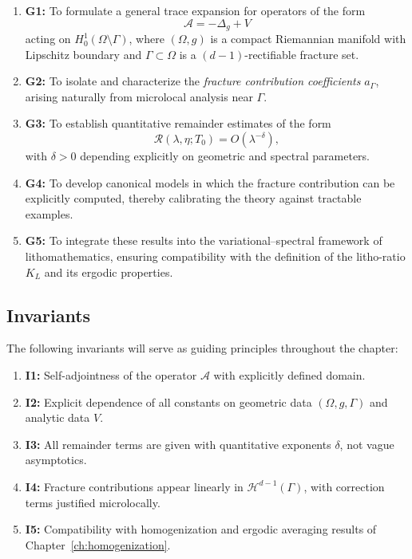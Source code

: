 \begin{enumerate}[label=\textbf{G\arabic*}]
  \item \textbf{G1:} To formulate a general trace expansion for operators of the form
  \[
    \mathcal{A} = -\Delta_g + V
  \]
  acting on $H^1_0(\Omega \setminus \Gamma)$, where $(\Omega,g)$ is a compact
  Riemannian manifold with Lipschitz boundary and $\Gamma \subset \Omega$ is a
  $(d-1)$-rectifiable fracture set.
  \item \textbf{G2:} To isolate and characterize the \emph{fracture
  contribution coefficients} $a_\Gamma$, arising naturally from microlocal
  analysis near $\Gamma$.
  \item \textbf{G3:} To establish quantitative remainder estimates of the form
  \[
    \mathcal{R}(\lambda,\eta;T_0) = O(\lambda^{-\delta}),
  \]
  with $\delta > 0$ depending explicitly on geometric and spectral parameters.
  \item \textbf{G4:} To develop canonical models in which the fracture
  contribution can be explicitly computed, thereby calibrating the theory
  against tractable examples.
  \item \textbf{G5:} To integrate these results into the variational–spectral
  framework of lithomathematics, ensuring compatibility with the definition of
  the litho-ratio $K_L$ and its ergodic properties.
\end{enumerate}

\subsection*{Invariants}

The following invariants will serve as guiding principles throughout the
chapter:

\begin{enumerate}[label=\textbf{I\arabic*}]
  \item \textbf{I1:} Self-adjointness of the operator $\mathcal{A}$ with
  explicitly defined domain.
  \item \textbf{I2:} Explicit dependence of all constants on geometric data
  $(\Omega,g,\Gamma)$ and analytic data $V$.
  \item \textbf{I3:} All remainder terms are given with quantitative exponents
  $\delta$, not vague asymptotics.
  \item \textbf{I4:} Fracture contributions appear linearly in $\mathcal{H}^{d-1}(\Gamma)$,
  with correction terms justified microlocally.
  \item \textbf{I5:} Compatibility with homogenization and ergodic averaging
  results of Chapter~\ref{ch:homogenization}.
\end{enumerate}

